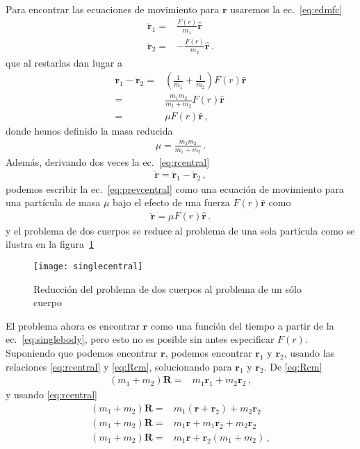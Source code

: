 Para encontrar las ecuaciones de movimiento para $\mathbf{r}$ usaremos la ec.~\eqref{eq:edmfc}
\begin{align}
  \ddot{\mathbf{r}}_1=&\frac{F(r)}{m_1}\hat{\mathbf{r}}\nonumber\\
  \ddot{\mathbf{r}}_2=&-\frac{F(r)}{m_2}\hat{\mathbf{r}}\,.
\end{align}
que al restarlas dan lugar a
\begin{align}
  \label{eq:prevcentral}
  \ddot{\mathbf{r}}_1-\ddot{\mathbf{r}}_2=&\left(\frac{1}{m_1}+\frac{1}{m_2}\right)F(r)\hat{\mathbf{r}}\nonumber\\
  =&\frac{m_1 m_2}{m_1+m_2}F(r)\hat{\mathbf{r}}\nonumber\\
  =&\mu F(r)\hat{\mathbf{r}}\,,
\end{align}
donde hemos definido la masa reducida
\begin{align}
  \mu=  \frac{m_1 m_2}{m_1+m_2}\,.
\end{align}
Además, derivando dos veces la ec.~\eqref{eq:rcentral}
\begin{align}
   \ddot{\mathbf{r}}=\ddot{\mathbf{r}}_1-\ddot{\mathbf{r}}_2\,,
\end{align}
podemos escribir la ec.~\eqref{eq:prevcentral} como una ecuación de movimiento para una partícula de masa $\mu$ bajo el efecto de una fuerza $F(r)\hat{\mathbf{r}}$ como
\begin{align}
  \label{eq:singlebody}
  \ddot{\mathbf{r}}=\mu F(r)\hat{\mathbf{r}}\,.
\end{align}
y el problema de dos cuerpos se reduce al problema de una sola partícula como se ilustra en la figura~\ref{fig:singlecentral}
\begin{figure}
  \centering
  \texttt{[image: singlecentral]}
  \caption{Reducción del problema de dos cuerpos al problema de un sólo cuerpo}
  \label{fig:singlecentral}
\end{figure}
El problema ahora es encontrar $\mathbf{r}$ como una función del tiempo a partir de la ec.~\eqref{eq:singlebody}, pero esto no es posible sin antes especificar $F(r)$. Suponiendo que podemos encontrar $\mathbf{r}$, podemos encontrar $\mathbf{r}_1$ y $\mathbf{r}_2$, usando las relaciones \eqref{eq:rcentral} y \eqref{eq:Rcm}, solucionando para $\mathbf{r}_1$ y $\mathbf{r}_2$. De \eqref{eq:Rcm}
\begin{align}
  (m_1+m_2)\mathbf{R}=&m_1\mathbf{r}_1+m_2\mathbf{r}_2\,,
\end{align}
y usando \eqref{eq:rcentral}
\begin{align}
   (m_1+m_2)\mathbf{R}=&m_1(\mathbf{r}+\mathbf{r}_2)+m_2\mathbf{r}_2\nonumber\\
     (m_1+m_2)\mathbf{R}=&m_1\mathbf{r}+m_1\mathbf{r}_2+m_2\mathbf{r}_2\nonumber\\
     (m_1+m_2)\mathbf{R}=&m_1\mathbf{r}+\mathbf{r}_2(m_1+m_2)\,,
\end{align}
